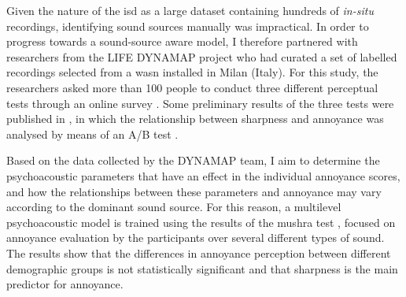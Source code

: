 Given the nature of the \gls{isd} as a large dataset containing hundreds of \emph{in-situ} recordings, identifying sound sources manually was impractical. In order to progress towards a sound-source aware model, I therefore partnered with researchers from the LIFE DYNAMAP project who had curated a set of labelled recordings selected from a \gls{wasn} installed in Milan (Italy). For this study, the researchers asked more than 100 people to conduct three different perceptual tests through an online survey . Some preliminary results of the three tests were published in , in which the relationship between sharpness and annoyance was analysed by means of an A/B test . 


Based on the data collected by the DYNAMAP team, I aim to determine the psychoacoustic parameters that have an effect in the individual annoyance scores, and how the relationships between these parameters and annoyance may vary according to the dominant sound source. For this reason, a multilevel psychoacoustic model is trained using the results of the \gls{mushra} test , focused on annoyance evaluation by the participants over several different types of sound. The results show that the differences in annoyance perception between different demographic groups is not statistically significant and that sharpness is the main predictor for annoyance.


